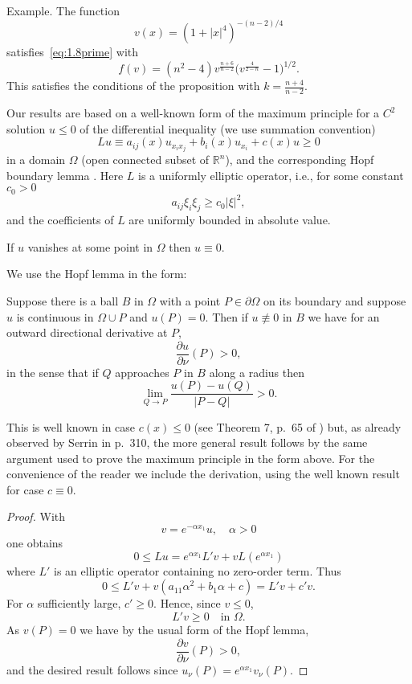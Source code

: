 Example. The function
\[v(x) = (1+|x|^4)^{-(n-2)/4}\]
satisfies~\eqref{eq:1.8prime} with
\[f(v) = (n^2-4) v^{\frac{n+6}{n-2}} \biggl(v^{\frac{4}{2-n}}-1\biggr)^{1/2}.\]
This satisfies the conditions of the proposition with $k = \frac{n+4}{n-2}$.

\medskip

\hspace{1em}Our results are based on a well-known form of the maximum principle \cite{protter_maximum_1984} for
a $C^2$ solution $u\leq 0$ of the differential inequality (we use summation convention)
\begin{equation}\label{eq:1.10}
  Lu\equiv a_{ij}(x)u_{x_ix_j} + b_i(x)u_{x_i} + c(x)u \geq 0
\end{equation}
in a domain $\Omega$ (open connected subset of $\mathbb{R}^n$),
and the corresponding Hopf boundary lemma \cite{protter_maximum_1984}. 
Here $L$ is a uniformly elliptic operator, i.e., for some constant $c_0>0$
\begin{equation}\label{eq:1.11}
  a_{ij}\xi_i\xi_j \geq c_0|\xi|^2,
\end{equation}
and the coefficients of $L$ are uniformly bounded in absolute value.

\begin{MP}
If $u$ vanishes at some point in $\Omega$ then $u\equiv 0$.
\end{MP}

We use the Hopf lemma in the form:

\begin{lemmaH}
  Suppose there is a ball $B$ in $\Omega$ with a point $P\in\partial\Omega$
  on its boundary and suppose $u$ is continuous in $\Omega\cup P$ and $u(P)=0$.
  Then if $u\not\equiv 0$ in $B$ we have for an outward directional derivative at $P$,
  \[\frac{\partial u}{\partial \nu}(P) > 0,\]
  in the sense that if $Q$ approaches $P$ in $B$ along a radius then
  \[\lim_{Q\to P} \frac{u(P)-u(Q)}{|P-Q|} > 0.\]
\end{lemmaH}

This is well known in case $c(x)\leq 0$ (see Theorem 7, p.~65 of \cite{protter_maximum_1984}) but,
as already observed by Serrin in \cite{serrin_symmetry_1971} p.~310, the more general result follows by the same
argument used to prove the maximum principle in the form above.
For the convenience of the reader we include the derivation, using the well known
result for case $c\equiv 0$.

\begin{proof}
  With
  \[v = e^{-\alpha x_1} u, \quad \alpha>0\]
  one obtains
  \[0\leq Lu = e^{\alpha x_1} L'v + vL(e^{\alpha x_1})\]
  where $L'$ is an elliptic operator containing no zero-order term. Thus
  \[0\leq L'v + v(a_{11}\alpha^2 + b_1\alpha +c) = L'v + c'v.\]
  For $\alpha$ sufficiently large, $c'\geq 0$. Hence, since $v\leq 0$,
  \[L'v \geq 0\quad \text{in } \Omega.\]
  As $v(P)=0$ we have by the usual form of the Hopf lemma,
  \[\frac{\partial v}{\partial \nu}(P)>0,\]
  and the desired result follows since $u_{\nu}(P) = e^{\alpha x_1} v_{\nu}(P)$.
\end{proof}

